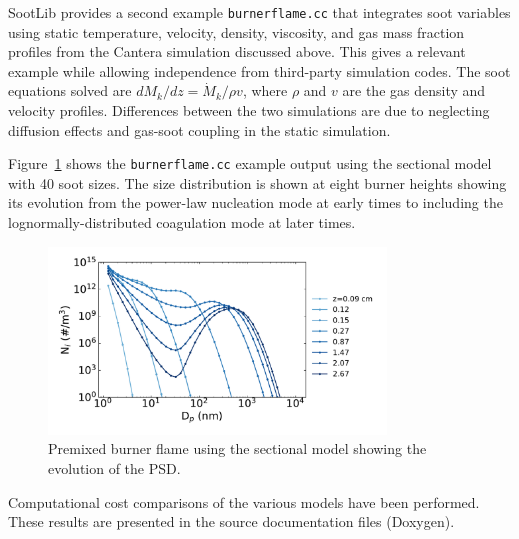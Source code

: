 \documentclass[preprint,letterpaper]{elsarticle}
\begin{document}
SootLib provides a second example \texttt{burner\textunderscore flame.cc} that integrates soot variables using static temperature, velocity, density, viscosity, and gas mass fraction profiles from the Cantera simulation discussed above. This gives a relevant example while allowing independence from third-party simulation codes. The soot equations solved are $dM_k/dz = \dot{M}_k/\rho v$, where $\rho$ and $v$ are the gas density and velocity profiles. Differences between the two simulations are due to neglecting diffusion effects and gas-soot coupling in the static simulation.

Figure~\ref{f:sectional} shows the \texttt{burner\textunderscore flame.cc} example output using the sectional model with 40 soot sizes. The size distribution is shown at eight burner heights showing its evolution from the power-law nucleation mode at early times to including the lognormally-distributed coagulation mode at later times.
%
\begin{figure}
    \begin{center}
        \includegraphics[width=0.8\textwidth]{../figures/premixed/sectional/sectional.pdf}
    \end{center}
    \caption{Premixed burner flame using the sectional model showing the evolution of the PSD.}
    \label{f:sectional}
\end{figure}
%

Computational cost comparisons of the various models have been performed. These results are presented in the source documentation files (Doxygen).

\end{document}

